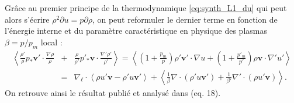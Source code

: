 Grâce au premier principe de la thermodynamique \eqref{eq:synth_L1_du} qui peut alors s'écrire $\rho^2 \partial u = p \partial \rho $, on peut reformuler le dernier terme en fonction de l'énergie interne et du paramètre caractéristique en physique des plasmas $\beta = p/p_m$ local :
\begin{eqnarray}
\label{eq:turb_ref_beta}    \left<\frac{\rho'}{\rho} p_*  \boldsymbol{v'} \cdot \frac{\nabla \rho}{\rho} \right.&+& \left.\frac{\rho}{\rho'} p'_*  \boldsymbol{v} \cdot \frac{\nabla' \rho'}{\rho'} \right> = \left<\left(1+\frac{p_m}{p}\right)\rho' \boldsymbol{v'} \cdot \nabla u + \left(1+\frac{p'_m}{p'}\right)\rho \boldsymbol{v} \cdot \nabla' u'\right>\nonumber \\ &=& \nabla_{\boldsymbol{\ell}} \cdot \left<\rho u' \boldsymbol{v} - \rho' u \boldsymbol{v'}\right> + \left<\frac{1}{\beta}\nabla\cdot\left(\rho'  u \boldsymbol{v'}\right)  + \frac{1}{\beta'}\nabla'\cdot\left(\rho u'\boldsymbol{v}\right)   \right> .
\end{eqnarray}
On retrouve ainsi le résultat publié et analysé dans \cite{simon_general_2021} (eq. 18).

